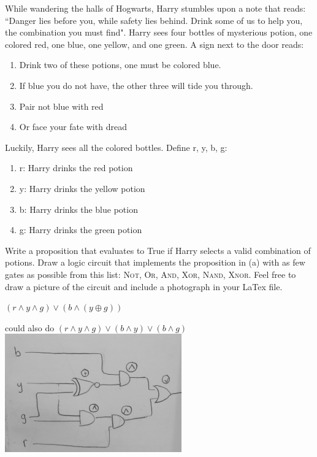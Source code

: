 \documentclass[solution, letterpaper]{cs20}
\begin{document}


While wandering the halls of Hogwarts, Harry stumbles upon a note that reads: ``Danger lies before you, while safety lies behind. Drink some of us to help you, the combination you must find". Harry sees four bottles of mysterious potion, one colored red, one blue, one yellow, and one green. A sign next to the door reads:

\begin{enumerate}
\item Drink two of these potions, one must be colored blue.
\item If blue you do not have, the other three will tide you through.
\item Pair not blue with red
\item Or face your fate with dread
\end{enumerate}

Luckily, Harry sees all the colored bottles. Define r, y, b, g:
\begin{enumerate}
\item r: Harry drinks the red potion
\item y: Harry drinks the yellow potion
\item b: Harry drinks the blue potion
\item g: Harry drinks the green potion
\end{enumerate}

\subproblem Write a proposition that evaluates to True if Harry selects a valid combination of potions. 
\subproblem Draw a logic circuit that implements the proposition in (a) with as few gates as possible from this list: \textsc{Not}, \textsc{Or}, \textsc{And}, \textsc{Xor}, \textsc{Nand}, \textsc{Xnor}. Feel free to draw a picture of the circuit and include a photograph in your LaTex file. 

\begin{solution}

\subsolution $(r \land y \land g) \lor (b \land (y \oplus g))$

could also do 
$(r \land y \land g) \lor (b \land y) \lor (b \land g)$
\subsolution 
\includegraphics[width=3in]{LogicGate.jpg}

\end{solution}
\end{document}
